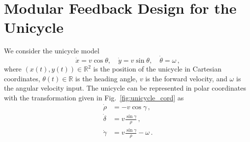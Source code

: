 \documentclass[letterpaper, 10 pt, conference]{ieeeconf}  %
\newcommand{\R}{\mathbb{R}}
\begin{document}
\section{Modular Feedback Design for the Unicycle}
\label{sec:modular_section}
We consider the unicycle model 
\begin{equation}
\dot{x} =  v \cos\theta, \quad 
\dot{y} = v \sin\theta,
\quad \dot{\theta} = \omega \,, \label{eq:unicycle_cartesian}
\end{equation}
where $(x(t),y(t)) \in \R^2$ is the position of the unicycle in Cartesian coordinates, $\theta(t) \in \mathbb{R}$ is the heading angle, $v$ is the forward velocity, and $\omega$ is the angular velocity input. The unicycle can be represented in polar coordinates with the transformation given in Fig.~\ref{fig:unicycle_cord} as
\begin{subequations}\label{eq:unicycle_polar_closed_loop-Gv-1}
    \begin{align}
    \dot{\rho} &= 
    -v \cos\gamma \,, \label{eq:unicycle_polar_rhodot}\\
    \dot{\delta} &= v  \frac{\sin\gamma}{\rho}\,, \label{eq:unicycle_polar_deltadot}\\
    \dot{\gamma} &= v \frac{\sin\gamma}{\rho} -\omega  \label{eq:unicycle_polar_gammadot} \,.
    \end{align} 
\end{subequations}
\end{document}
